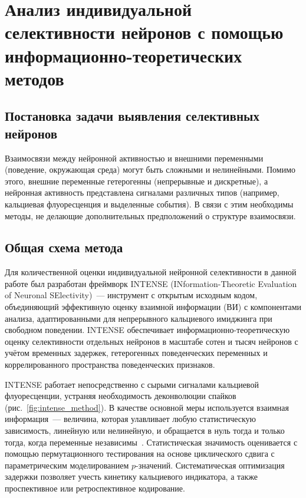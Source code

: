 %
%
%

\section{Анализ индивидуальной селективности нейронов с помощью информационно-теоретических методов}\label{sec:intense}

\subsection{Постановка задачи выявления селективных нейронов}

Взаимосвязи между нейронной активностью и внешними переменными (поведение, окружающая среда) могут быть сложными и нелинейными. Помимо этого, внешние переменные гетерогенны (непрерывные и дискретные), а нейронная активность представлена сигналами различных типов (например, кальциевая флуоресценция и выделенные события). В связи с этим необходимы методы, не делающие дополнительных предположений о структуре взаимосвязи.

\subsection{Общая схема метода}

Для количественной оценки индивидуальной нейронной селективности в данной работе был разработан фреймворк INTENSE (INformation-Theoretic Evaluation of Neuronal SElectivity)~--- инструмент с открытым исходным кодом, объединяющий эффективную оценку взаимной информации (ВИ) с компонентами анализа, адаптированными для непрерывного кальциевого имиджинга при свободном поведении. INTENSE обеспечивает информационно-теоретическую оценку селективности отдельных нейронов в масштабе сотен и тысяч нейронов с учётом временных задержек, гетерогенных поведенческих переменных и коррелированного пространства поведенческих признаков.

INTENSE работает непосредственно с сырыми сигналами кальциевой флуоресценции, устраняя необходимость деконволюции спайков (рис.~\ref{fig:intense_method}). В качестве основной меры используется взаимная информация~--- величина, которая улавливает любую статистическую зависимость, линейную или нелинейную, и обращается в нуль тогда и только тогда, когда переменные независимы~\cite{Shannon1948, Borst1999, Strong1998}. Статистическая значимость оценивается с помощью пермутационного тестирования на основе циклического сдвига с параметрическим моделированием $p$-значений. Систематическая оптимизация задержки позволяет учесть кинетику кальциевого индикатора, а также проспективное или ретроспективное кодирование.

